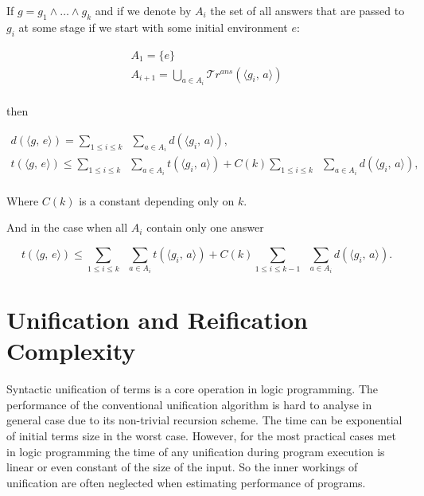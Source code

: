 \documentclass[acmsmall, anonymous, review]{acmart}
\newcommand{\taskst}[2]{\langle #1 ,\, #2 \rangle}
\newcommand{\tra}[1]{\mathcal{T}r^{ans}(#1)}
\begin{document}
\begin{lemma}

If $g = g_1 \land \dots \land g_k$ and if we denote by $A_i$ the set of all answers that are passed to $g_i$ at some stage if we start with some initial environment $e$:

\[ \begin{array}{l}
A_1 = \{ e \} \\
A_{i + 1} = \bigcup\limits_{a \in A_i} \tra{\taskst{g_i}{a}} \\
\end{array} \]

then

\[ \begin{array}{l}
d(\taskst{g}{e}) = \sum\limits_{1 \le i \le k} \;\; \sum\limits_{a \in A_i} d(\taskst{g_i}{a}), \\
t(\taskst{g}{e}) \le \sum\limits_{1 \le i \le k} \;\; \sum\limits_{a \in A_i} t(\taskst{g_i}{a}) + C(k) \sum\limits_{1 \le i \le k} \;\; \sum\limits_{a \in A_i} d(\taskst{g_i}{a}), \\
\end{array} \]

Where $C(k)$ is a constant depending only on $k$.

And in the case when all $A_i$ contain only one answer

\[ t(\taskst{g}{e}) \le \sum\limits_{1 \le i \le k} \;\; \sum\limits_{a \in A_i} t(\taskst{g_i}{a}) + C(k) \sum\limits_{1 \le i \le k - 1} \;\; \sum\limits_{a \in A_i} d(\taskst{g_i}{a}). \]

\end{lemma}

\section{Unification and Reification Complexity}

Syntactic unification of terms is a core operation in logic programming. The performance of the  conventional unification algorithm is hard to analyse in general case due to its non-trivial recursion scheme. The time can be exponential of initial terms size in the worst case. However, for the most practical cases met in logic programming the time of any unification during program execution is linear or even constant of the size of the input. So the inner workings of unification are often neglected when estimating performance of programs.
\end{document}

